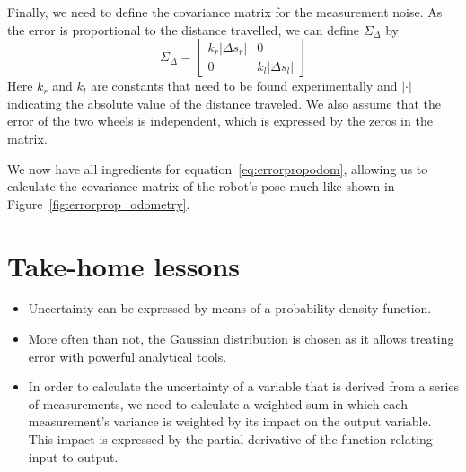 Finally, we need to define the covariance matrix for the measurement noise. As the error is proportional to the distance travelled, we can define $ \Sigma_{\Delta}$ by
\begin{equation}
\Sigma_{\Delta}=\left[\begin{array}{cc}k_r|\Delta s_r| & 0\\0 & k_l|\Delta s_l|\end{array}\right]
\end{equation}
Here $ k_r$ and $ k_l$ are constants that need to be found experimentally and $ |\cdot |$ indicating the absolute value of the distance traveled. We also assume that the error of the two wheels is independent, which is expressed by the zeros in the matrix.

We now have all ingredients for equation~\ref{eq:errorpropodom}, allowing us to calculate the covariance matrix of the robot's pose much like shown in Figure~\ref{fig:errorprop_odometry}.

\section{Take-home lessons}
\begin{itemize}
\item Uncertainty can be expressed by means of a probability density function.
\item More often than not, the Gaussian distribution is chosen as it allows treating error with powerful analytical tools.
\item In order to calculate the uncertainty of a variable that is derived from a series of measurements, we need to calculate a weighted sum in which each measurement's variance is weighted by its impact on the output variable. This impact is expressed by the partial derivative of the function relating input to output.
\end{itemize}

